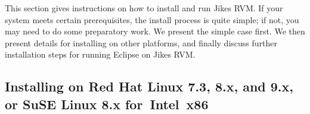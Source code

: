 \newcommand{\AtManualClasspathRootDiscussion}[1]{at
 \link{the discussion of setting up \texttt{CLASSPATH\_ROOT}#1}[; it's in
 Section~\ref{sec:manual-classpath-root}, item~\Ref,
 subitem~\texttt{CLASS\-PATH\_\-ROOT}, on page~\Pageref]{manual-classpath-root}.}%
This section gives instructions on how to install and run Jikes\TMweb{} RVM.
If your system meets certain prerequisites, the install process is
quite simple; if not, you may need to do some preparatory work.  We
present the simple case first.  We then present details for installing
on other platforms, and finally discuss further installation steps for
running Eclipse on Jikes RVM.

\subsection{Installing on Red Hat Linux 7.3, 8.x, and 9.x, or SuSE Linux 8.x for~Intel~x86}

